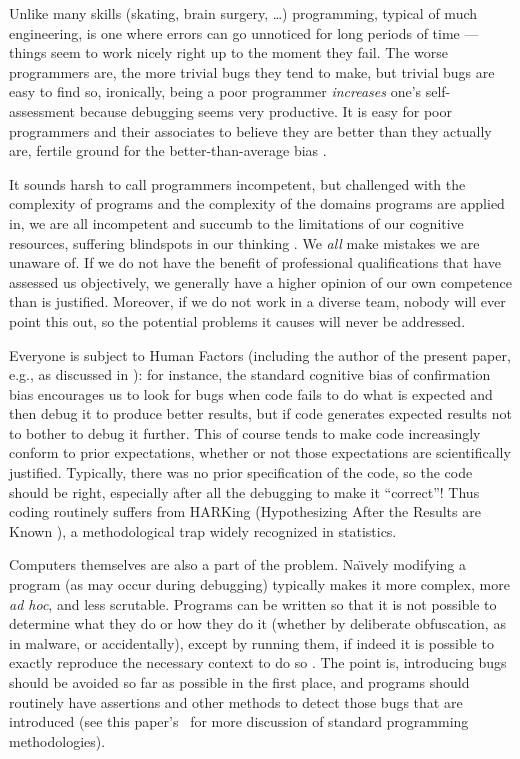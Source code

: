 \documentclass[10pt,a4paper]{article}
\begin{document}
Unlike many skills (skating, brain surgery, \ldots) programming, typical of much engineering, is one where errors can go unnoticed for long periods of time --- things seem to work nicely right up to the moment they fail. The worse programmers are, the more trivial bugs they tend to make, but trivial bugs are easy to find so, ironically, being a poor programmer \emph{increases\/} one's self-assessment because debugging seems very productive. It is easy for poor programmers and their associates to believe they are better than they actually are, fertile ground for the better-than-average bias \cite{dunning-kruger}.

It sounds harsh to call programmers incompetent, but challenged with the complexity of programs and the complexity of the domains programs are applied in, we are all incompetent and succumb to the limitations of our cognitive resources, suffering blindspots in our thinking \cite{fixit}. We \emph{all\/} make mistakes we are unaware of. If we do not have the benefit of professional qualifications that have assessed us objectively, we generally have a higher opinion of our own competence than is justified. Moreover, if we do not work in a diverse team, nobody will ever point this out, so the potential problems it causes will never be addressed.

{Everyone is subject to Human Factors (including the author of the present paper, e.g., as discussed in \cite{enigma}): for instance, the standard cognitive bias of confirmation bias encourages us to look for bugs when code fails to do what is expected and then debug it to produce better results, but if code generates expected results not to bother to debug it further. This of course tends to make code increasingly conform to prior expectations, whether or not those expectations are scientifically justified. Typically, there was no prior specification of the code, so the code should be right, especially after all the debugging to make it ``correct''! Thus coding routinely suffers from HARKing (Hypothesizing After the Results are Known \cite{harking}), a methodological trap widely recognized in statistics.}

Computers themselves are also a part of the problem. Na\"\i vely modifying a program (as may occur during debugging) typically makes it more complex, more \emph{ad hoc}, and less scrutable. Programs can be written so that it is not possible to determine what they do or how they do it (whether by deliberate obfuscation, as in malware, or accidentally), except by running them, if indeed it is possible to exactly reproduce the necessary context to do so \cite{viruses}. The point is, introducing bugs should be avoided so far as possible in the first place, and programs should routinely have assertions and other methods to detect those bugs that are introduced (see this paper's \supplement\ for more discussion of standard programming methodologies).
\end{document}
